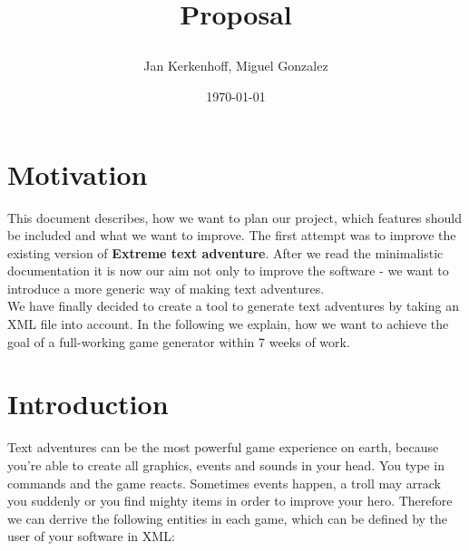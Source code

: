 \documentclass[dvips,12pt]{article}
\begin{document}
\title{
\begin{center}
\end{center}
Proposal
}

\author{Jan Kerkenhoff, Miguel Gonzalez}
\date{\today}

\maketitle

\section{Motivation}

This document describes, how we want to plan our project, which features should be included and what we want to improve. The first attempt was to improve the existing version of \textbf{Extreme text adventure}. After we read the minimalistic documentation it is now our aim not only to improve the software - we want to introduce a more generic way of making text adventures.\\

We have finally decided to create a tool to generate text adventures by taking an XML file into account. In the following we explain, how we want to achieve the goal of a full-working game generator within 7 weeks of work.

\section{Introduction}

Text adventures can be the most powerful game experience on earth, because you're able to create all graphics, events and sounds in your head. You type in commands and the game reacts. Sometimes events happen, a troll may arrack you suddenly or you find mighty items in order to improve your hero. Therefore we can derrive the following entities in each game, which can be defined by the user of your software in XML:
\end{document}
